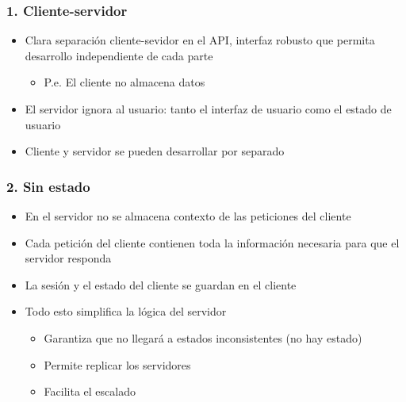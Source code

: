 \documentclass[ucs]{beamer}
\begin{document}
\begin{frame}[fragile]
\frametitle{1. Cliente-servidor}
\begin{itemize}
\item
Clara separación cliente-sevidor en el API, interfaz robusto que permita desarrollo
independiente de cada parte

\begin{itemize}
\item
P.e. El cliente no almacena datos
\end{itemize}

\item
El servidor ignora al usuario: tanto el interfaz de usuario como el estado de usuario
\item
Cliente y servidor se pueden desarrollar por separado
\end{itemize}

\end{frame}




\begin{frame}[fragile]
\frametitle{2. Sin estado}

\begin{itemize}
\item
En el servidor no se almacena contexto de las peticiones del cliente
\item
Cada petición del cliente contienen toda la información necesaria para
que el servidor responda
\item
La sesión y el estado del cliente se guardan en el cliente
\item
Todo esto simplifica la lógica del servidor

\begin{itemize}
\item
Garantiza que no llegará
a estados inconsistentes (no hay estado)
\item
Permite replicar los servidores
\item
Facilita el escalado
\end{itemize}
\end{itemize}

\end{frame}
\end{document}
